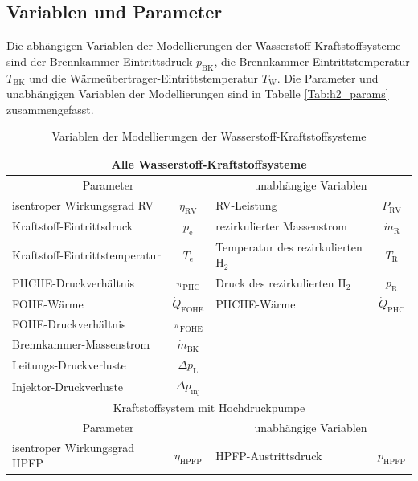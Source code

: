 \subsection{Variablen und Parameter}

Die abhängigen Variablen der Modellierungen der Wasserstoff-Kraftstoffsysteme sind der Brennkammer-Eintrittsdruck $p_{\mathrm{BK}}$, die Brennkammer-Eintrittstemperatur $T_\mathrm{BK}$ und die Wärmeübertrager-Eintrittstemperatur $T_\mathrm{W}$. Die Parameter und unabhängigen Variablen der Modellierungen sind in Tabelle \ref{Tab:h2_params} zusammengefasst.

\begin{table}[ht]
    \centering
	\caption{Variablen der Modellierungen der Wasserstoff-Kraftstoffsysteme}
	\begin{tabular} {|l|c|l|c|} \hline%
    \multicolumn{4}{|c}{Alle Wasserstoff-Kraftstoffsysteme}\\ \hline
    \multicolumn{2}{|c}{Parameter} & \multicolumn{2}{|c|}{unabhängige Variablen}\\ \hline\hline%
    isentroper Wirkungsgrad RV & $\eta_\mathrm{RV}$ & RV-Leistung & $P_{\mathrm{RV}}$ \\ \hline
    Kraftstoff-Eintrittsdruck & $p_\mathrm{e}$ & rezirkulierter Massenstrom & $\dot{m}_\mathrm{R}$ \\ \hline
    Kraftstoff-Eintrittstemperatur & $T_\mathrm{e}$ & Temperatur des rezirkulierten H$_2$ & $T_\mathrm{R}$ \\ \hline
    PHCHE-Druckverhältnis  & $\pi_{\mathrm{PHC}}$ & Druck des rezirkulierten H$_2$ & $p_\mathrm{R}$\\ \hline
    FOHE-Wärme & $\dot{Q}_{\mathrm{FOHE}}$ & PHCHE-Wärme  & $\dot{Q}_{\mathrm{PHC}}$\\ \hline
    FOHE-Druckverhältnis & $\pi_{\mathrm{FOHE}}$ & \multicolumn{2}{c|}{}\\ \hline
    Brennkammer-Massenstrom & $\dot{m}_\mathrm{BK}$ & \multicolumn{2}{c|}{}\\ \hline
    Leitungs-Druckverluste & $\Delta p_{\mathrm{L}}$ & \multicolumn{2}{c|}{}\\ \hline
    Injektor-Druckverluste & $\Delta p_{\mathrm{inj}}$ & \multicolumn{2}{c|}{}\\ \hline\hline
	\multicolumn{4}{|c|}{Kraftstoffsystem mit Hochdruckpumpe}\\ \hline
    \multicolumn{2}{|c}{Parameter} & \multicolumn{2}{|c|}{unabhängige Variablen}\\ \hline\hline%
    isentroper Wirkungsgrad HPFP & $\eta_{\mathrm{HPFP}}$ & HPFP-Austrittsdruck & $p_{\mathrm{HPFP}}$ \\ \hline

\end{tabular}
\end{table}
